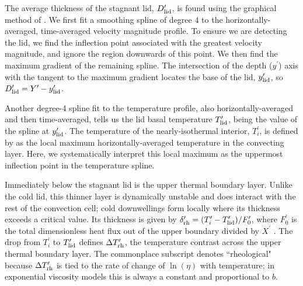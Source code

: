 The average thickness of the stagnant lid, $D_{\rm lid}^\prime$, is found using the graphical method of \citet{solomatov_scaling_2000}. We first fit a smoothing spline of degree $4$ to the horizontally-averaged, time-averaged velocity magnitude profile. To ensure we are detecting the lid, we find the inflection point associated with the greatest velocity magnitude, and ignore the region downwards of this point. We then find the maximum gradient of the remaining spline. The intersection of the depth ($y^\prime$) axis with the tangent to the maximum gradient locates the base of the lid, $y^\prime_{\rm lid}$, so $D_{\rm lid}^\prime = Y^\prime - y^\prime_{\rm lid}$. 

Another degree-4 spline fit to the temperature profile, also horizontally-averaged and then time-averaged, tells us the lid basal temperature $T_{\rm lid}^\prime$, being the value of the spline at $y^\prime_{\rm lid}$. The temperature of the nearly-isothermal interior, $T_i^\prime$, is defined by \citet{solomatov_scaling_2000} as the local maximum horizontally-averaged temperature in the convecting layer. Here, we systematically interpret this local maximum as the uppermost inflection point in the temperature spline. 

Immediately below the stagnant lid is the upper thermal boundary layer. Unlike the cold lid, this thinner layer is dynamically unstable and does interact with the rest of the convection cell; cold downwellings form locally where its thickness exceeds a critical value. %
Its thickness is given by $\delta_{\rm rh}^\prime = (T_i^\prime - T_{\rm lid}^\prime)/F_0^\prime$, where $F_0^\prime$ is the total dimensionless heat flux out of the upper boundary divided by $X^\prime$ \citep{thiriet_scaling_2019}. The drop from $T_i^\prime$ to $T_{\rm lid}^\prime$ defines $\Delta T_{\rm rh}^\prime$, the temperature contrast across the upper thermal boundary layer. The commonplace subscript denotes ``rheological" because $\Delta T_{\rm rh}^\prime$ is tied to the rate of change of $\ln(\eta)$ with temperature; in exponential viscosity models this is always a constant and proportional to $b$.

